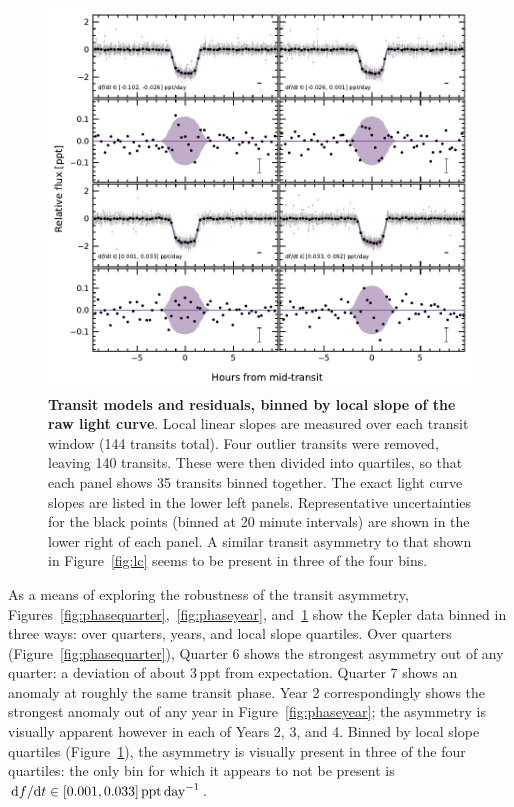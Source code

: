\documentclass[12pt,modern,twocolumn,tighten]{aastex63}
\begin{document}
\begin{figure}[t]
	\begin{center}
		\leavevmode
		\includegraphics[width=\textwidth]{f9.pdf}
	\end{center}
	\vspace{-0.7cm}
	\caption{
    {\bf Transit models and residuals, binned by local slope of the
    raw light curve}.  Local linear slopes are measured over each
    transit window (144 transits total).  Four outlier transits were
    removed, leaving 140 transits.  These were then divided into
    quartiles, so that each panel shows 35 transits binned together.
    The exact light curve slopes are listed in the lower left panels.
    Representative uncertainties for the black points (binned at 20
    minute intervals) are shown in the lower right of each panel.  A
    similar transit asymmetry to that shown in Figure~\ref{fig:lc}
    seems to be present in three of the four bins.
		\label{fig:phaseslope}
	}
\end{figure}


As a means of exploring the robustness of the transit asymmetry,
Figures~\ref{fig:phasequarter},~\ref{fig:phaseyear},
and~\ref{fig:phaseslope} show the Kepler data binned in three ways:
over quarters, years, and local slope quartiles.  Over quarters
(Figure~\ref{fig:phasequarter}), Quarter 6 shows the strongest asymmetry
out of any quarter: a deviation of about 3\,ppt from expectation.
Quarter 7 shows an anomaly at roughly the same transit phase.  Year 2
correspondingly shows the strongest anomaly out of any year in
Figure~\ref{fig:phaseyear}; the asymmetry is visually apparent however
in each of Years 2, 3, and 4.
Binned by local slope quartiles (Figure~\ref{fig:phaseslope}), the
asymmetry is visually present in three of the four quartiles: the only
bin for which it appears to not be present is ${\rm d}f/{\rm
d}t\in[0.001,0.033]\,{\rm ppt\,day}^{-1}$.
\end{document}
